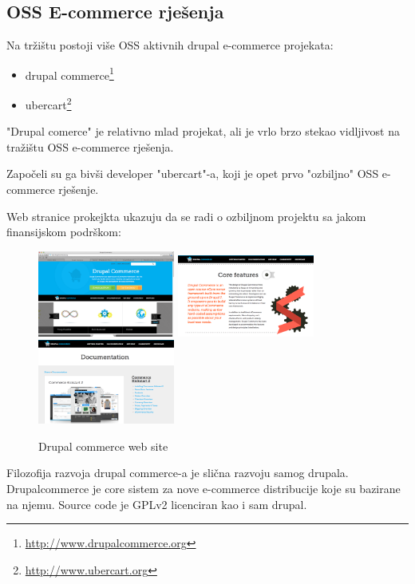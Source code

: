 \documentclass[times, utf8, seminar]{fit}
\begin{document}
{\subsection{OSS E-commerce rješenja}

Na tržištu postoji više OSS aktivnih drupal e-commerce projekata:

\begin{itemize}
\ubercart  
\item drupal commerce\footnote{\url{http://www.drupalcommerce.org}} 
\item ubercart\footnote{\url{http://www.ubercart.org}}
\end{itemize}

"Drupal comerce" je relativno mlad projekat, ali je vrlo brzo stekao vidljivost na tražištu OSS e-commerce rješenja.

Započeli su ga bivši developer "ubercart"-a, koji je opet prvo "ozbiljno" OSS e-commerce rješenje.

Web stranice prokejkta ukazuju da se radi o ozbiljnom projektu sa jakom finansijskom podrškom:

\begin{figure}[H]
\centering
\includegraphics[width=4.5cm]{img/drupalcommerce_web.png}\hfill
\includegraphics[width=4.5cm]{img/drupalcommerce_web_2.png}\hfill
\includegraphics[width=4.5cm]{img/drupalcommerce_web_3.png} 
\caption{Drupal commerce web site}
\end{figure}

Filozofija razvoja drupal commerce-a je slična razvoju samog drupala. Drupalcommerce je core sistem za nove e-commerce distribucije koje su bazirane na njemu.
Source code je GPLv2 licenciran kao i sam drupal.

}
\end{document}
